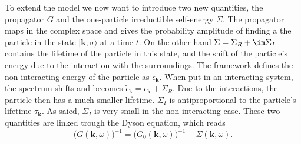 \documentclass[../main.tex]{subfile}
\begin{document}
To extend the model we now want to introduce two new quantities,
the propagator $G$ and the one-particle irreductible self-energy $\Sigma$.
The propagator maps in the complex space and gives the probability amplitude of finding a the particle in the state $|\bm{k},\sigma\rangle$ at a time $t$. On the other hand 
$\Sigma = \Sigma_R + \im \Sigma_I$ contains 
the lifetime of the particle in this state, and the shift of the particle's energy due to the interaction with the surroundings. The framework defines the 
non-interacting energy of the particle as $\epsilon_{\bm{k}}$. When put in an interacting system, the spectrum shifts and becomes 
$\tilde{\epsilon}_{\bm{k}} =  \epsilon_{\bm{k}} + \Sigma_R$. Due to the interactions, the particle then has a much smaller lifetime. $\Sigma_I$ is antiproportional to 
the particle's lifetime $\tau_{\bm{k}}$. As saied, $\Sigma_I$ is very small in the non interacting case. 
These two quantities are linked trough the Dyson equation, which reads
\begin{equation} \label{eq:Dyson}
    \bigl(G(\bm{k}, \omega)\bigr)^{-1} =  \bigl(G_0(\bm{k}, \omega)\bigr)^{-1} - \Sigma(\bm{k},\omega).
\end{equation}
\end{document}
